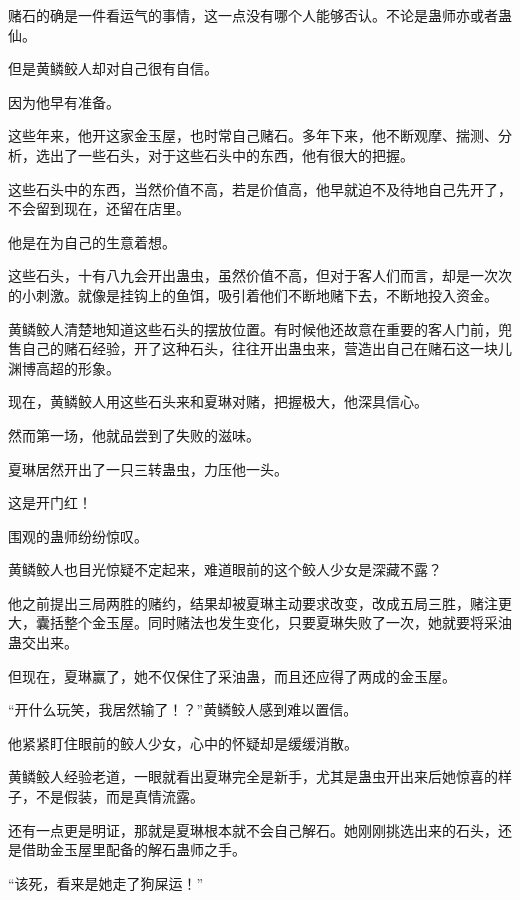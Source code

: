 
\begin{this_body}

赌石的确是一件看运气的事情，这一点没有哪个人能够否认。不论是蛊师亦或者蛊仙。

但是黄鳞鲛人却对自己很有自信。

因为他早有准备。

这些年来，他开这家金玉屋，也时常自己赌石。多年下来，他不断观摩、揣测、分析，选出了一些石头，对于这些石头中的东西，他有很大的把握。

这些石头中的东西，当然价值不高，若是价值高，他早就迫不及待地自己先开了，不会留到现在，还留在店里。

他是在为自己的生意着想。

这些石头，十有八九会开出蛊虫，虽然价值不高，但对于客人们而言，却是一次次的小刺激。就像是挂钩上的鱼饵，吸引着他们不断地赌下去，不断地投入资金。

黄鳞鲛人清楚地知道这些石头的摆放位置。有时候他还故意在重要的客人门前，兜售自己的赌石经验，开了这种石头，往往开出蛊虫来，营造出自己在赌石这一块儿渊博高超的形象。

现在，黄鳞鲛人用这些石头来和夏琳对赌，把握极大，他深具信心。

然而第一场，他就品尝到了失败的滋味。

夏琳居然开出了一只三转蛊虫，力压他一头。

这是开门红！

围观的蛊师纷纷惊叹。

黄鳞鲛人也目光惊疑不定起来，难道眼前的这个鲛人少女是深藏不露？

他之前提出三局两胜的赌约，结果却被夏琳主动要求改变，改成五局三胜，赌注更大，囊括整个金玉屋。同时赌法也发生变化，只要夏琳失败了一次，她就要将采油蛊交出来。

但现在，夏琳赢了，她不仅保住了采油蛊，而且还应得了两成的金玉屋。

“开什么玩笑，我居然输了！？”黄鳞鲛人感到难以置信。

他紧紧盯住眼前的鲛人少女，心中的怀疑却是缓缓消散。

黄鳞鲛人经验老道，一眼就看出夏琳完全是新手，尤其是蛊虫开出来后她惊喜的样子，不是假装，而是真情流露。

还有一点更是明证，那就是夏琳根本就不会自己解石。她刚刚挑选出来的石头，还是借助金玉屋里配备的解石蛊师之手。

“该死，看来是她走了狗屎运！”


\end{this_body}
